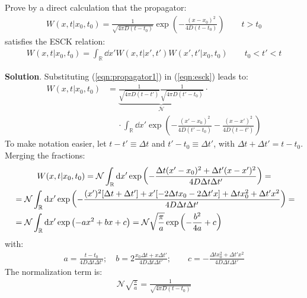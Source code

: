 \documentclass[../template.tex]{subfiles}
\begin{document}
\begin{exo}
    Prove by a direct calculation that the propagator:
    \begin{align}
        W(x,t|x_0,t_0) = \frac{1}{\sqrt{4 \pi D (t-t_0)}}  \exp\left(-\frac{(x - x_0)^2}{4D (t-t_0)} \right) \qquad t> t_0 \label{eqn:propagator1}
    \end{align}
    satisfies the ESCK relation:
    \begin{align} \label{eqn:esck}
        W(x,t|x_0,t_0) = \int_{\mathbb{R}} \dd{x'} W(x,t|x',t') W(x',t'|x_0,t_0) \qquad t_0 < t' < t  
    \end{align}
    \medskip

    \textbf{Solution}. Substituting (\ref{eqn:propagator1}) in (\ref{eqn:esck}) leads to:
    \begin{align*}
        W(x,t|x_0,t_0) &= \underbrace{\frac{1}{\sqrt{4 \pi D (t-t')}} \frac{1}{\sqrt{4 \pi D(t'-t_0) }}}_{\mathcal{N}} \cdot \\
        &\quad \> \cdot \int_{\mathbb{R}} \dd{x'}    \exp\left(-\frac{(x'-x_0)^2}{4 D (t'-t_0)} -\frac{(x-x')^2}{4D(t-t')} \right)
    \end{align*}
    To make notation easier, let $t-t' \equiv \Delta t$ and $t'-t_0 \equiv \Delta t'$, with $\Delta t + \Delta t' = t-t_0$. Merging the fractions:
    \begin{align*}
        W(x,t|x_0,t_0) = \mathcal{N} \int_{\mathbb{R}} \dd{x'} \exp\left(-\frac{\Delta t (x'-x_0)^2 + \Delta t'(x-x')^2}{4 D \Delta t \Delta t'} \right) = \span\\
        &= \mathcal{N} \int_{\mathbb{R}} \dd{x'} \exp\left(-\frac{(x')^2[\Delta t + \Delta t'] + x'[-2 \Delta t x_0 - 2 \Delta t' x ] + \Delta t x_0^2 + \Delta t' x^2}{4 D \Delta t \Delta t'} \right) =\\
        &= \mathcal{N} \int_{\mathbb{R}} \dd{x'} \exp\left(-ax^2 + bx + c\right) = \mathcal{N} \sqrt{\frac{\pi}{a} } \exp\left(-\frac{b^2}{4a} + c \right)
    \end{align*}
    with:
    \begin{align*}
        a = \frac{t-t_0}{4 D \Delta t \Delta t'}; \quad b = 2\frac{x_0 \Delta t + x \Delta t'}{4D \Delta t \Delta t'}; \qquad c = -\frac{\Delta t x_0^2 + \Delta t' x^2 }{4D \Delta t \Delta t'}   
    \end{align*}
    The normalization term is:
    \begin{align*}
        \mathcal{N} \sqrt{\frac{\pi}{a} } = \frac{1}{\sqrt{4 \pi D(t-t_0) }} 
    \end{align*}

\end{exo}
\end{document}
